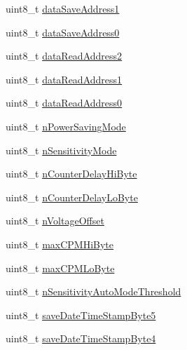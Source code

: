 \begin{DoxyCompactItemize}
\item 
uint8\-\_\-t \hyperlink{struct_g_q_l_l_c_1_1_g_q_g_m_c_1_1cfg__data__t_a864dc46442e10959e668bf704b579017}{data\-Save\-Address1}
\item 
uint8\-\_\-t \hyperlink{struct_g_q_l_l_c_1_1_g_q_g_m_c_1_1cfg__data__t_a7569084824363e4d0645f9b864c481d1}{data\-Save\-Address0}
\item 
uint8\-\_\-t \hyperlink{struct_g_q_l_l_c_1_1_g_q_g_m_c_1_1cfg__data__t_ad693e55a4de747ac03e61d19548bb96c}{data\-Read\-Address2}
\item 
uint8\-\_\-t \hyperlink{struct_g_q_l_l_c_1_1_g_q_g_m_c_1_1cfg__data__t_a38ad63a2daa6bfd06b4b59843904fca0}{data\-Read\-Address1}
\item 
uint8\-\_\-t \hyperlink{struct_g_q_l_l_c_1_1_g_q_g_m_c_1_1cfg__data__t_a3d2a16fe45141e67a647b41af318b45a}{data\-Read\-Address0}
\item 
uint8\-\_\-t \hyperlink{struct_g_q_l_l_c_1_1_g_q_g_m_c_1_1cfg__data__t_aa77f3c84ee478e1d2a4a554f8a9921f9}{n\-Power\-Saving\-Mode}
\item 
uint8\-\_\-t \hyperlink{struct_g_q_l_l_c_1_1_g_q_g_m_c_1_1cfg__data__t_a29e5221250e2d47321a820784cc2ba99}{n\-Sensitivity\-Mode}
\item 
uint8\-\_\-t \hyperlink{struct_g_q_l_l_c_1_1_g_q_g_m_c_1_1cfg__data__t_aee434c8d4c9124c2e450ba45d948a6e1}{n\-Counter\-Delay\-Hi\-Byte}
\item 
uint8\-\_\-t \hyperlink{struct_g_q_l_l_c_1_1_g_q_g_m_c_1_1cfg__data__t_a422f0c0e87667348e19a90f45379be76}{n\-Counter\-Delay\-Lo\-Byte}
\item 
uint8\-\_\-t \hyperlink{struct_g_q_l_l_c_1_1_g_q_g_m_c_1_1cfg__data__t_ada68d932c055a397eb0569096de90112}{n\-Voltage\-Offset}
\item 
uint8\-\_\-t \hyperlink{struct_g_q_l_l_c_1_1_g_q_g_m_c_1_1cfg__data__t_a1557b90a2d324a2e63df0dfce6086b64}{max\-C\-P\-M\-Hi\-Byte}
\item 
uint8\-\_\-t \hyperlink{struct_g_q_l_l_c_1_1_g_q_g_m_c_1_1cfg__data__t_aa0ea084d923c900a18d6ffb4020e4d9d}{max\-C\-P\-M\-Lo\-Byte}
\item 
uint8\-\_\-t \hyperlink{struct_g_q_l_l_c_1_1_g_q_g_m_c_1_1cfg__data__t_ae5b4a14de43d0e1672c99bb2dcd95b0b}{n\-Sensitivity\-Auto\-Mode\-Threshold}
\item 
uint8\-\_\-t \hyperlink{struct_g_q_l_l_c_1_1_g_q_g_m_c_1_1cfg__data__t_aadd445a767e66f441c6362928bb8ea61}{save\-Date\-Time\-Stamp\-Byte5}
\item 
uint8\-\_\-t \hyperlink{struct_g_q_l_l_c_1_1_g_q_g_m_c_1_1cfg__data__t_aed618bc058233ec8b45108559ac85826}{save\-Date\-Time\-Stamp\-Byte4}

\end{DoxyCompactItemize}
